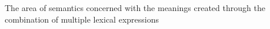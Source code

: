 The area of semantics concerned with the meanings created through the combination of multiple lexical expressions
